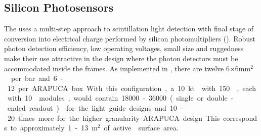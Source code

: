 




\subsection{Silicon Photosensors}
\label{sec:fdsp-pd-ps}

The   uses a multi-step approach to scintillation light detection with final stage of conversion into electrical charge performed by silicon photomultipliers (). Robust photon detection efficiency, low operating voltages, small size and ruggedness make their use attractive in the \single design where the photon detectors must be accommodated inside the  frames. 
As implemented in , there are twelve \num{6}$\times$\num{6}\si{mm$^2$}  per bar and 6-12 per ARAPUCA box.
With this configuration, a \SI{10}{kt}  with \num{150} , each with \num{10}  modules, would contain \num{18000}-\num{36000} (single or double-ended readout)  for the light guide designs and 10-20 times more for the higher granularity ARAPUCA design. This corresponds to approximately \num{1}-\SI{13}{m$^2$} of active  surface area.

